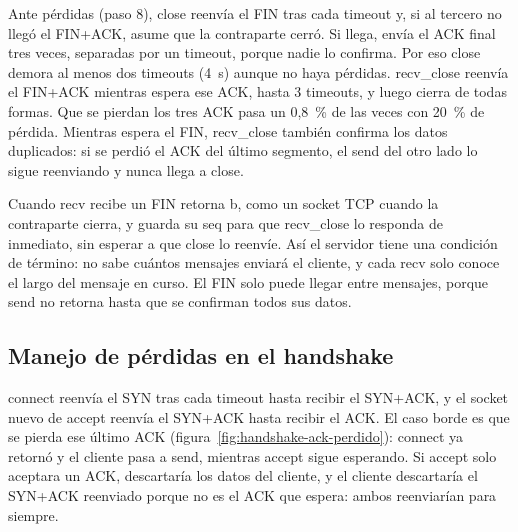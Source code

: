 \documentclass[
	spanish, %
	letterpaper, oneside
]{article}
\newcommand{\code}[1]{#1}     %
\newcommand{\flag}[1]{#1}     %
\newcommand{\field}[1]{#1}    %
\begin{document}
Ante pérdidas (paso 8), \code{close} reenvía el \flag{FIN} tras cada timeout y, si al tercero no
llegó el \flag{FIN+ACK}, asume que la contraparte cerró. Si llega, envía el \flag{ACK} final tres
veces, separadas por un timeout, porque nadie lo confirma. Por eso \code{close} demora al menos
dos timeouts (4~s) aunque no haya pérdidas. \code{recv\_close} reenvía el \flag{FIN+ACK} mientras
espera ese \flag{ACK}, hasta 3 timeouts, y luego cierra de todas formas. Que se pierdan los tres
\flag{ACK} pasa un 0,8~\% de las veces con 20~\% de pérdida. Mientras espera el \flag{FIN},
\code{recv\_close} también confirma los datos duplicados: si se perdió el \flag{ACK} del último
segmento, el \code{send} del otro lado lo sigue reenviando y nunca llega a \code{close}.

Cuando \code{recv} recibe un \flag{FIN} retorna \code{b\textquotedbl\textquotedbl{}}, como un socket TCP cuando la
contraparte cierra, y guarda su \field{seq} para que \code{recv\_close} lo responda de inmediato,
sin esperar a que \code{close} lo reenvíe. Así el servidor tiene una condición de término: no
sabe cuántos mensajes enviará el cliente, y cada \code{recv} solo conoce el largo del mensaje en
curso. El \flag{FIN} solo puede llegar entre mensajes, porque \code{send} no retorna hasta que se
confirman todos sus datos.

\subsection{Manejo de pérdidas en el handshake}
\label{sec:handshake-perdidas}
\code{connect} reenvía el \flag{SYN} tras cada timeout hasta recibir el \flag{SYN+ACK}, y el
socket nuevo de \code{accept} reenvía el \flag{SYN+ACK} hasta recibir el \flag{ACK}. El caso
borde es que se pierda ese último \flag{ACK} (figura~\ref{fig:handshake-ack-perdido}):
\code{connect} ya retornó y el cliente pasa a \code{send}, mientras \code{accept} sigue esperando.
Si \code{accept} solo aceptara un \flag{ACK}, descartaría los datos del cliente, y el cliente
descartaría el \flag{SYN+ACK} reenviado porque no es el \flag{ACK} que espera: ambos reenviarían
para siempre.
\end{document}
